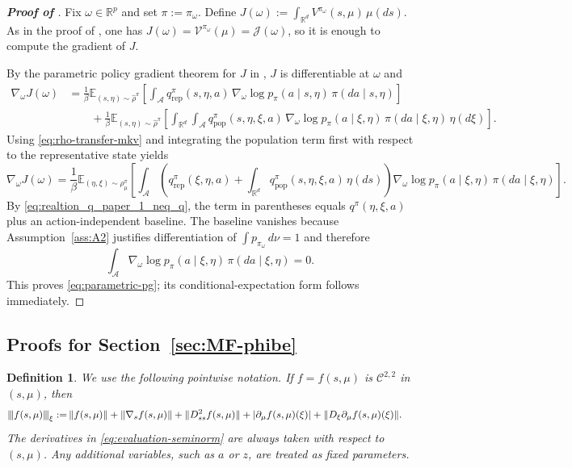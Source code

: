 \documentclass[a4paper, 10pt, english, reqno]{amsart}
\newcommand{\tnorm}[1]{\left\vert\kern-0.25ex\left\vert\kern-0.25ex\left\vert #1
\right\vert\kern-0.25ex\right\vert\kern-0.25ex\right\vert}
\newtheorem{definition}[theorem]{Definition}
\begin{document}
\begin{proof}[\textbf{Proof of }]
Fix $\omega\in\mathbb R^p$ and set $\pi:=\pi_\omega$. Define $J(\omega):=\int_{\mathbb R^d}V^{\pi_\omega}(s,\mu)\,\mu(ds).$ As in the proof of , one has
$J(\omega)=\mathcal V^{\pi_\omega}(\mu)=\mathcal J(\omega)$, so it is
enough to compute the gradient of $J$.

By the parametric policy gradient theorem for $J$ in \cite[Theorem 4.9]{firstpaper},
$J$ is differentiable at $\omega$ and
\[
\begin{aligned}
\nabla_\omega J(\omega)
&=
\frac{1}{\beta}\mathbb E_{(s,\eta)\sim\widehat\rho^\pi}\!\left[
\int_{\mathcal A}
q_{\mathrm{rep}}^\pi(s,\eta,a)\,
\nabla_\omega\log p_\pi(a\mid s,\eta)\,
\pi(da\mid s,\eta)
\right]\\
&\qquad+
\frac{1}{\beta}\mathbb E_{(s,\eta)\sim\widehat\rho^\pi}\!\left[
\int_{\mathbb R^d}\!\int_{\mathcal A}
q_{\mathrm{pop}}^\pi(s,\eta,\xi,a)\,
\nabla_\omega\log p_\pi(a\mid \xi,\eta)\,
\pi(da\mid \xi,\eta)\,
\eta(d\xi)
\right].
\end{aligned}
\]
Using \eqref{eq:rho-transfer-mkv} and integrating the population term
first with respect to the representative state yields
\[
\nabla_\omega J(\omega)
=\frac1\beta
\mathbb E_{(\eta,\xi)\sim\rho_\mu^\pi}
\left[
\int_{\mathcal A}
\left(
q_{\mathrm{rep}}^\pi(\xi,\eta,a)
+\int_{\mathbb R^d}q_{\mathrm{pop}}^\pi(s,\eta,\xi,a)\,\eta(ds)
\right)
\nabla_\omega\log p_\pi(a\mid\xi,\eta)
\,\pi(da\mid\xi,\eta)
\right].
\]
By \eqref{eq:realtion_q_paper_1_neq_q}, the term in parentheses equals
$q^\pi(\eta,\xi,a)$ plus an action-independent baseline. The baseline
vanishes because Assumption~\ref{ass:A2} justifies differentiation of
$\int p_{\pi_\omega}\,d\nu=1$ and therefore
\[
\int_{\mathcal A}
\nabla_\omega\log p_\pi(a\mid\xi,\eta)
\,\pi(da\mid\xi,\eta)=0.
\]
This proves \eqref{eq:parametric-pg}; its conditional-expectation form
follows immediately.
\end{proof}


\subsection{Proofs for Section~\ref{sec:MF-phibe}}
\label{app:error-proofs}


\begin{definition}
   We use the following pointwise notation. If $f=f(s,\mu)$ is
$\mathcal C^{2,2}$ in $(s,\mu)$, then
\begin{equation}
\label{eq:evaluation-seminorm}
\begin{aligned}
\tnorm{f(s,\mu)}_{\xi}
:=
&\,\|f(s,\mu)\|
+\|\nabla_s f(s,\mu)\|
+\|D_{ss}^2 f(s,\mu)\|
+
|\partial_\mu f(s,\mu)(\xi)|
+
\|D_\xi\partial_\mu f(s,\mu)(\xi)\|.
\end{aligned}
\end{equation}
The derivatives in \eqref{eq:evaluation-seminorm} are always taken with
respect to $(s,\mu)$. Any additional variables, such as $a$ or $z$, are
treated as fixed parameters.
\end{definition}
\end{document}
